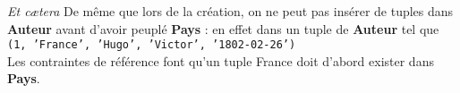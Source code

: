 \documentclass[10pt]{beamer}
\begin{document}
\begin{frame}{\textit{Et c\ae tera}}
	De même que lors de la création, on ne peut pas insérer de tuples dans \textbf{Auteur} avant d'avoir peuplé \textbf{Pays} : en effet dans un tuple de \textbf{Auteur} tel que \\

    \texttt{(1, 'France', 'Hugo', 'Victor', '1802-02-26')}\\

    Les contraintes de référence font qu'un tuple \og France\fg{} doit d'abord exister dans \textbf{Pays}.
\end{frame}
\end{document}
